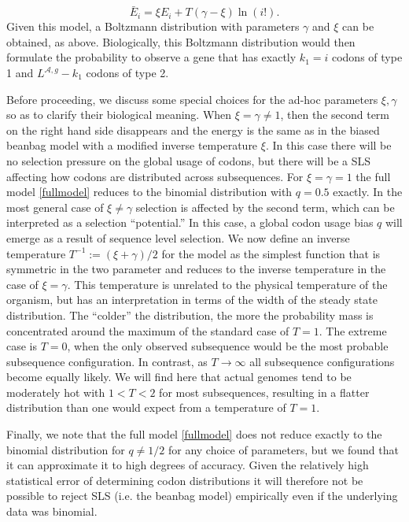 \documentclass[a4paper,10pt]{paper}%
\begin{document}
%
% 
\begin{equation}
\bar E_i= \xi E_i +  T (\gamma - \xi) \ln(i!).
\label{fullmodel}
\end{equation}
%
%
Given this model, a Boltzmann distribution with parameters $\gamma$ and $\xi$ can be obtained, as above. Biologically, this Boltzmann distribution  would then  formulate the probability to observe a gene that has exactly $k_1=i$ codons of type 1 and $L^{\mathcal A, g} -k_1$ codons of type 2. 
\par
Before proceeding, we discuss some special choices for the ad-hoc parameters $\xi,\gamma$ so as to clarify their biological meaning. When   $\xi=\gamma\neq 1$, then  the  second term on the right hand side disappears and the   energy is the same as in the biased beanbag model  with a modified inverse temperature $\xi$. In this case there will be no selection pressure on the  global usage of codons, but  there will be a SLS  affecting how codons are distributed across subsequences. For $\xi=\gamma = 1$ the full model  \ref{fullmodel}  reduces to  the binomial distribution  with $q=0.5$ exactly.  In the   most general case of   $\xi\neq\gamma$  selection is affected by  the second term, which can be interpreted as a selection   ``potential.''  In this case, a global codon usage bias $q$ will emerge as a result of sequence level selection.  We  now define an inverse temperature $T^{-1} :=(\xi + \gamma)/2$ for the  model as  the simplest function that is  symmetric in the two parameter  and reduces to the inverse temperature in the case of $\xi = \gamma$.  This temperature is unrelated to the physical temperature of the organism, but has  an interpretation in terms of the width of the steady state distribution. The ``colder'' the distribution, the more  the probability mass is concentrated around the maximum of the standard case of $T=1$.  The extreme  case  is  $T=0$, when   the only observed subsequence would be the  most probable subsequence configuration.  In contrast, as $T\to\infty$  all subsequence configurations become equally likely. We will find here that actual genomes tend to be moderately hot with $1<T<2$ for most subsequences, resulting in a flatter distribution than one would expect from a temperature of $T=1$.  
\par
Finally, we note that the  full model \ref{fullmodel} does not reduce exactly to  the binomial distribution for $q\neq 1/2$ for any choice of parameters, but we found that it can approximate it to  high degrees of accuracy.  Given the relatively high statistical error of determining codon distributions  it will therefore   not be possible to reject SLS  (i.e. the beanbag model) empirically even if the underlying data was binomial.
\end{document}
